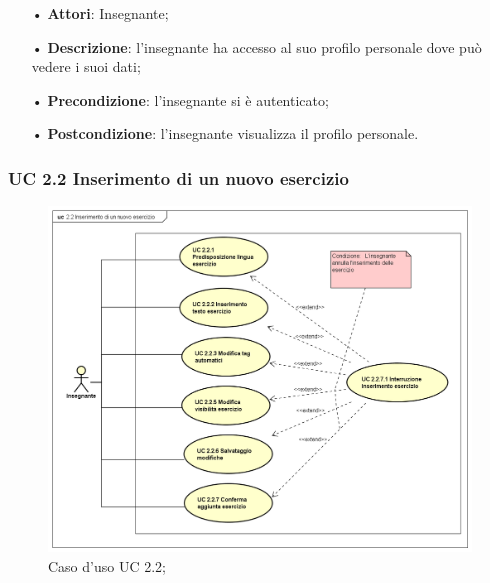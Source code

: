\begin{itemize}
	\item[•] \textbf{Attori}: Insegnante;
	\item[•] \textbf{Descrizione}: l'insegnante ha accesso al suo profilo personale dove può vedere i suoi dati;
	\item[•] \textbf{Precondizione}: l'insegnante si è autenticato;
	\item[•] \textbf{Postcondizione}: l'insegnante visualizza il profilo personale.

\end{itemize}


\subsubsection{UC 2.2 Inserimento di un nuovo esercizio}



\begin{figure}[H]
	\centering
	\includegraphics[width=17cm]{img/UC22SISTEMA.png} 
	\caption{Caso d'uso UC 2.2;}
\end{figure}


